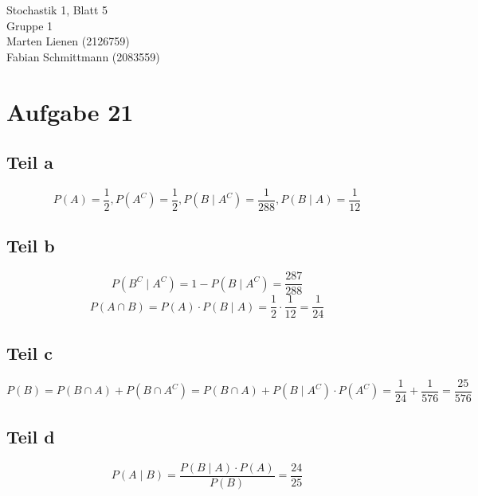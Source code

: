 \documentclass[10pt,a4paper]{article}
\begin{document}
Stochastik 1, Blatt 5\\
Gruppe 1\\
Marten Lienen (2126759)\\
Fabian Schmittmann (2083559)

\section{Aufgabe 21}

\subsection{Teil a}
\begin{equation}
  P(A) = \frac{1}{2}, P(A^{C}) = \frac{1}{2}, P(B \mid A^{C}) = \frac{1}{288}, P(B \mid A) = \frac{1}{12}
\end{equation}

\subsection{Teil b}
\begin{equation}
  P(B^{C} \mid A^{C}) = 1 - P(B \mid A^{C}) = \frac{287}{288}
\end{equation}
\begin{equation}
  P(A \cap B) = P(A) \cdot P(B \mid A) = \frac{1}{2} \cdot \frac{1}{12} = \frac{1}{24}
\end{equation}

\subsection{Teil c}
\begin{equation}
  P(B) = P(B \cap A) + P(B \cap A^{C}) = P(B \cap A) + P(B \mid A^{C}) \cdot P(A^{C}) = \frac{1}{24} + \frac{1}{576} = \frac{25}{576}
\end{equation}

\subsection{Teil d}
\begin{equation}
  P(A \mid B) = \frac{P(B \mid A) \cdot P(A)}{P(B)} = \frac{24}{25}
\end{equation}
\end{document}
